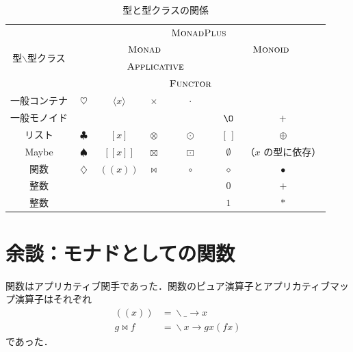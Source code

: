 \documentclass[a5paper,twoside,fleqn,draft]{jsbook}
\def\[{[\![}
\def\]{]\!]}
\newcommand{\mEmptyList}{{[\,]}}
\newcommand{\mNothing}{\emptyset}
\newcommand{\mZero}{\O}
\newcommand{\mAnonParam}{\diamond}
\DeclareMathOperator{\mAppend}{\oplus}
\DeclareMathOperator{\mAppMap}{\times}
\DeclareMathOperator{\mAppMapFunc}{\bowtie}
\DeclareMathOperator{\mAppMapList}{\otimes}
\DeclareMathOperator{\mAppMapMaybe}{\boxtimes}
\DeclareMathOperator{\mBind}{\heartsuit}
\DeclareMathOperator{\mBindFunc}{\diamondsuit}
\DeclareMathOperator{\mBindList}{\clubsuit}
\DeclareMathOperator{\mBindMaybe}{\spadesuit}
\DeclareMathOperator{\mComp}{\bullet}
\DeclareMathOperator{\mLambda}{\backslash}
\DeclareMathOperator{\mLambdaArrow}{\rightarrow}
\DeclareMathOperator{\mMap}{\cdot}
\DeclareMathOperator{\mMapFunc}{\circ}
\DeclareMathOperator{\mMapList}{\odot}
\DeclareMathOperator{\mMapMaybe}{\boxdot}
\DeclareMathOperator{\mPlus}{\boldmath{+}} %
\newcommand{\mValueConstructor}[1]{\mathrm{#1}}
\newcommand{\mValueWith}[2]{{}^\mValueConstructor{#1}\[#2\]}
\newcommand{\mJustWith}[1]{\[#1\]}%
\newcommand{\mFuncWith}[1]{((#1))}  %
\newcommand{\mPureWith}[1]{\langle#1\rangle}
\newcommand{\mTypeClass}[1]{\textsc{#1}} %
\newcommand{\mApplicativeTypeClass}{\mTypeClass{Applicative}}
\newcommand{\mFunctorTypeClass}{\mTypeClass{Functor}}
\newcommand{\mMonadTypeClass}{\mTypeClass{Monad}}
\newcommand{\mMonadPlusTypeClass}{\mTypeClass{MonadPlus}}
\newcommand{\mMonoidTypeClass}{\mTypeClass{Monoid}}
\newcommand{\mLambdaEXP}[2]{\mLambda{#1}\mLambdaArrow{#2}} %
\begin{document}

\begin{table}
\label{tab:monadplus}
\caption{型と型クラスの関係}
\begin{center}
\begin{tabular}{||c||c|c|c|c|c|c||}
\hline
\multirow{4}{*}{型$\backslash$型クラス}
  &\multicolumn{6}{|c||}{$\mMonadPlusTypeClass$}\\
\cline{2-7}
\multirow{3}{*}{}
  &\multicolumn{4}{|c|}{$\mMonadTypeClass$}
  &\multicolumn{2}{|c||}{$\mMonoidTypeClass$}\\
\cline{3-5}
\multirow{2}{*}{}
  &
  &\multicolumn{3}{|c|}{$\mApplicativeTypeClass$}
  &\multicolumn{2}{|c||}{}\\
\cline{5-5}
\multirow{1}{*}{}
  &
  &\multicolumn{2}{|c|}{}
  &$\mFunctorTypeClass$
  &\multicolumn{2}{|c||}{}\\
\hline\hline
一般コンテナ
  &$\mBind$
  &$\mPureWith{x}$
  &$\mAppMap$
  &$\mMap$
  &
  &\\
\hline
一般モノイド
  &
  &
  &
  &
  &$\mZero$
  &$\mPlus$\\
\hline
リスト
  &$\mBindList$
  &$[x]$
  &$\mAppMapList$
  &$\mMapList$
  &$\mEmptyList$
  &$\mAppend$\\
\hline
Maybe
  &$\mBindMaybe$
  &$\mJustWith{x}$
  &$\mAppMapMaybe$
  &$\mMapMaybe$
  &$\mNothing$
  &（$x$ の型に依存）\\
\hline
関数
  &$\mBindFunc$
  &$\mFuncWith{x}$
  &$\mAppMapFunc$
  &$\mMapFunc$
  &$\mAnonParam$
  &$\mComp$\\
\hline
整数
  &
  &
  &
  &
  &$0$
  &$+$\\
\hline
整数
  &
  &
  &
  &
  &$1$
  &$*$\\
\hline
\end{tabular}
\end{center}
\end{table}

\section{余談：モナドとしての関数}

関数はアプリカティブ関手であった．関数のピュア演算子とアプリカティブマッ
プ演算子はそれぞれ
\begin{align}
\mFuncWith{x}&=\mLambdaEXP{\_}{x}\\
g\mAppMapFunc f&=\mLambdaEXP{x}{gx(fx)}
\end{align}
であった．
\end{document}
